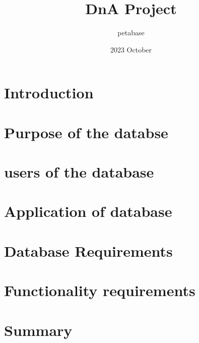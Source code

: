 \documentclass{article}
\title{DnA Project}
\date{2023 October}
\author{petabase}
\begin{document}
\maketitle

\section{Introduction}

\section{Purpose of the databse}

\section{users of the database}

\section{Application of database}

\section{Database Requirements}

\section{Functionality requirements}

\section{Summary}

\end{document}
